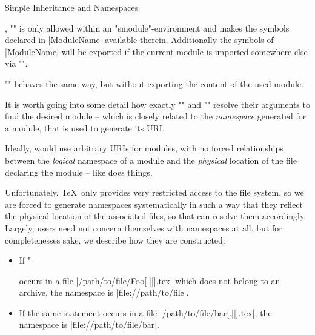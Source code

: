 \begin{sfragment}{Simple Inheritance and Namespaces}

    \begin{function}{\importmodule,\usemodule}
      \stexcode"" is only allowed within an
      \stexcode"smodule"-environment and makes the symbols declared in |ModuleName|
      available therein. Additionally the symbols of |ModuleName| will be exported if the
      current module is imported somewhere else via \stexcode"\importmodule".

      \stexcode"\usemodule" behaves the same way, but without exporting the content of the
      used module.
    \end{function}

    It is worth going into some detail how exactly \stexcode"\importmodule"
    and \stexcode"\usemodule" resolve their arguments to find
    the desired module -- which is closely related to the
    \emph{namespace} generated for a module, that is used to generate
    its URI.

    \begin{dangerbox}
        Ideally, \sTeX would use arbitrary URIs for modules, with no
   forced relationships between the \emph{logical} namespace
   of a module and the \emph{physical} location of the file
   declaring the module -- like \mmt does things.

   Unfortunately, \TeX\ only provides very restricted access to
   the file system, so we are forced to generate namespaces
   systematically in such a way that they reflect the physical
   location of the associated files, so that \sTeX can resolve
   them accordingly. Largely, users need not concern themselves
   with namespaces at all, but for completenesses sake, we describe
   how they are constructed:

   \begin{itemize}
     \item If \stexcode"\fi occurs in a file
       |/path/to/file/Foo[.||].tex| which does not belong
       to an archive, the namespace is |file://path/to/file|.
     \item If the same statement occurs in a file
       |/path/to/file/bar[.||].tex|, the namespace is 
       |file://path/to/file/bar|.
   \end{itemize}


\end{dangerbox}
\end{sfragment}
